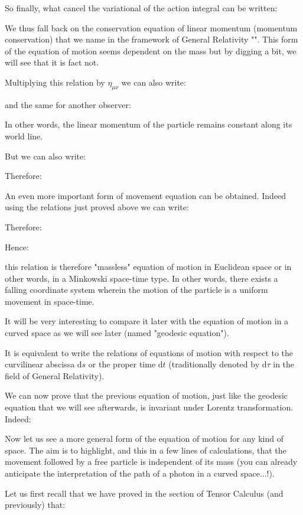 	So finally, what cancel the variational of the action integral can be written:
	
	We thus fall back on the conservation equation of linear momentum (momentum conservation) that we name in the framework of General Relativity "". This form of the equation of motion seems dependent on the mass but by digging a bit, we will see that it is fact not.
	
	Multiplying this relation by $\eta_{\mu\nu}$ we can also write:
	
	and the same for another observer:
	
	In other words, the linear momentum of the particle remains constant along its world line.

	But we can also write:
	
	Therefore:
	
	An even more important form of movement equation can be obtained. Indeed using the relations just proved above we can write:
	
	Therefore:
	
	Hence:
	
	this relation is therefore "massless" equation of motion in Euclidean space or in other words, in a Minkowski space-time type. In other words, there exists a falling coordinate system wherein the motion of the particle is a uniform movement in space-time.
	
	It will be very interesting to compare it later with the equation of motion in a curved space as we will see later (named "geodesic equation").
	\begin{tcolorbox}[title=Remark,colframe=black,arc=10pt]
	It is equivalent to write the relations of equations of motion with respect to the curvilinear abscissa $\mathrm{d}s$ or the proper time $\mathrm{d}t$ (traditionally denoted by $\mathrm{d}\tau$ in the field of General Relativity).
	\end{tcolorbox}
	We can now prove that the previous equation of motion, just like the geodesic equation that we will see afterwards, is invariant under Lorentz transformation. Indeed:
	
	Now let us see a more general form of the equation of motion for any kind of space. The aim is to highlight, and this in a few lines of calculations, that the movement followed by a free particle is independent of its mass (you can already anticipate the interpretation of the path of a photon in a curved space...!).

	Let us first recall that we have proved in the section of Tensor Calculus (and previously) that:
	
